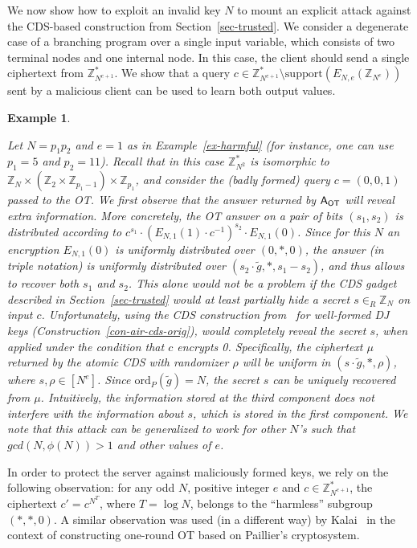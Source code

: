 \documentclass[11pt]{article}
\newtheorem{Example}[theorem]{Example}
\newenvironment{example}{\begin{Example}\begin{rm}}{\end{rm}\end{Example}}
\newcommand{\ansot}{{\sf A_{OT}}}
\newcommand{\encdj}{{E}_{N,e}}
\newcommand{\Z}{\mathbb{Z}}
\newcommand{\U}[1]{\mathbb{Z}_{#1}^*}
\newcommand\ot{\mbox{OT}\xspace}
\newcommand{\otns}{\mbox{OT}}
\newcommand{\encr}[2]{E_{#1}(#2)}
\newcommand{\order}{{\mathrm{ord}}}
\newcommand{\support}{{\mathrm{support}}}
\begin{document}
We now show how to exploit an invalid key $N$ to mount an explicit
attack against the CDS-based construction from
Section~\ref{sec-trusted}.
We consider a degenerate case of a branching program over a single
input variable, which consists of two terminal nodes and one
internal node. In this case, the client should send a single
ciphertext from $\U{N^{e+1}}$. We show that a query
$c\in\U{N^{e+1}}\setminus\support(\encdj(\Z_{N^e}))$ sent by a
malicious client can be used to learn both output values.
\begin{example}
\label{ex-fullymal-attack} Let $N=p_1p_2$ and $e=1$ as in
Example~\ref{ex-harmful} (for instance, one can use $p_1=5$ and
$p_2=11$). Recall that in this case $\U{N^2}$ is isomorphic to
$\Z_N\times (\Z_2\times\Z_{p_1-1})\times \Z_{p_1}$, and consider
the (badly formed) query $c=(0,0,1)$ passed to the \otns. We first
observe that the answer returned by $\ansot$ will reveal extra
information. More concretely, the OT answer on a pair of bits
$(s_1,s_2)$ is distributed according to
$c^{s_1}\cdot(\encr{N,1}{1}\cdot c^{-1})^{s_2}\cdot \encr{N,1}{0}$.
Since for this $N$ an encryption $\encr{N,1}{0}$ is uniformly
distributed over $(0,*,0)$, the answer (in triple notation) is
uniformly distributed over $(s_2\cdot \tilde{g},*,s_1-s_2)$, and
thus allows to recover both $s_1$ and $s_2$. This alone would not be
a problem if the CDS gadget described in Section~\ref{sec-trusted}
would at least partially hide a secret $s\in_R\Z_N$ on input $c$. Unfortunately, using the CDS
construction from~\cite{AIR01} for well-formed DJ keys (Construction~\ref{con-air-cds-orig}),
would completely reveal the secret $s$, when applied under
the condition that $c$ encrypts 0. Specifically, the ciphertext
$\mu$ returned by the atomic CDS with randomizer $\rho$ will be
uniform in $(s\cdot \tilde{g},*,\rho)$, where $s,\rho\in[N^e]$.
Since $\order_P(\tilde{g})=N$,  the secret $s$ can be uniquely
recovered from $\mu$. Intuitively, the information stored at the
third component does not interfere with the information about $s$, which is stored in the first component. We note that this attack can be generalized to work for
other $N$'s such that $gcd(N,\phi(N))>1$ and other values of $e$.
\end{example}

In order to protect the server against maliciously formed keys, we
rely on the following observation: for any odd $N$, positive
integer $e$ and $c\in \U{N^{e+1}}$, the ciphertext $c'=c^{N^T}$,
where $T=\log N$, belongs to the ``harmless'' subgroup $(*,*,0)$. A
similar observation was used (in a different way) by
Kalai~\cite{T05} in the context of constructing one-round OT based
on Paillier's cryptosystem.
\end{document}
